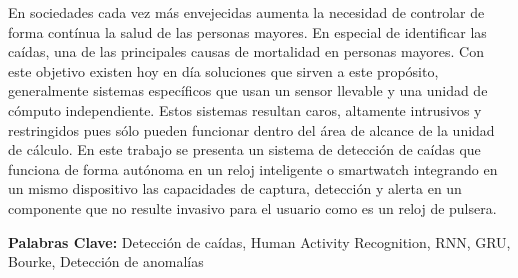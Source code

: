 %
En sociedades cada vez más envejecidas aumenta la necesidad de controlar de forma contínua la salud de las personas mayores. En especial de identificar las caídas, una de las principales causas de mortalidad en personas mayores. Con este objetivo existen hoy en día soluciones que sirven a este propósito, generalmente sistemas específicos que usan un sensor llevable y una unidad de cómputo independiente. Estos sistemas resultan caros, altamente intrusivos y restringidos pues sólo pueden funcionar dentro del área de alcance de la unidad de cálculo. En este trabajo se presenta un sistema de detección de caídas que funciona de forma autónoma en un reloj inteligente o smartwatch integrando en un mismo dispositivo las capacidades de captura, detección y alerta en un componente que no resulte invasivo para el usuario como es un reloj de pulsera.

{\bf Palabras Clave:} Detección de caídas, Human Activity Recognition, RNN, GRU, Bourke, Detección de anomalías

%

